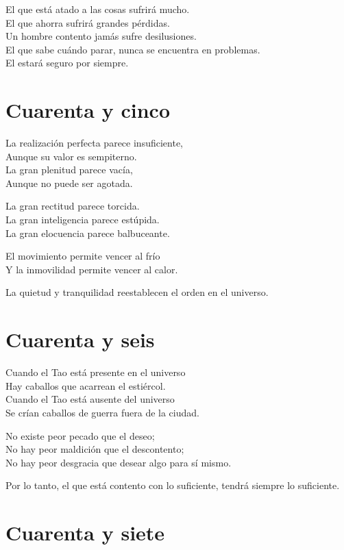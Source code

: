 \documentclass[book,b5paper,hidelinks,final]{memoir}
\begin{document}
	El que está atado a las cosas sufrirá mucho.\\
	El que ahorra sufrirá grandes pérdidas.\\
	Un hombre contento jamás sufre desilusiones.\\
	El que sabe cuándo parar, nunca se encuentra en problemas.\\
	El estará seguro por siempre.
	
	\chapter*{Cuarenta y cinco}
	
	La realización perfecta parece insuficiente,\\
	Aunque su valor es sempiterno.\\
	La gran plenitud parece vacía,\\
	Aunque no puede ser agotada.
	
	La gran rectitud parece torcida.\\
	La gran inteligencia parece estúpida.\\
	La gran elocuencia parece balbuceante.
	
	El movimiento permite vencer al frío\\
	Y la inmovilidad permite vencer al calor.
	
	La quietud y tranquilidad reestablecen el orden en el universo.
	
	\chapter*{Cuarenta y seis}
	
	Cuando el Tao está presente en el universo\\
	Hay caballos que acarrean el estiércol.\\
	Cuando el Tao está ausente del universo\\
	Se crían caballos de guerra fuera de la ciudad.
	
	No existe peor pecado que el deseo;\\
	No hay peor maldición que el descontento;\\
	No hay peor desgracia que desear algo para sí mismo.
	
	Por lo tanto, el que está contento con lo suficiente, tendrá siempre lo
	suficiente.
	
	\chapter*{Cuarenta y siete}
	
\end{document}
